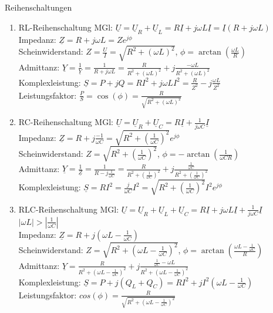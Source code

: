 \documentclass[german]{article}
\begin{document}
Reihenschaltungen
\begin{enumerate}
	\item RL-Reihenschaltung
		MGl: $\underline{U} = \underline{U}_R + \underline{U}_L = R \underline{I} + j\omega L \underline{I} = \underline{I} (R + j\omega L)$ \\
		Impedanz: $\underline{Z} = R + j \omega L = Z e^{j\phi}$ \\
		Scheinwiderstand: $Z = \frac{U}{I} = \sqrt{R^2 + (\omega L)^2}$, $\phi = \arctan\left( \frac{\omega L}{R} \right)$ \\
		Admittanz: $\underline{Y} = \frac1{\underline{Y}} = \frac1{R + j\omega L} = \frac{R}{R^2 + (\omega L)^2} + j \frac{-\omega L}{R^2 + (\omega L)^2}$ \\
		Komplexleistung: $\underline{S} = P + j Q = RI^2 + j\omega L I^2 = \frac{R}{Z^2} - j\frac{\omega L}{Z^2}$ \\
		Leistungsfaktor: $\frac{P}{S} = \cos(\phi) = \frac{R}{\sqrt{R^2 + (\omega L)^2}}$
	\item RC-Reihenschaltung
		MGl: $\underline{U} = \underline{U}_R + \underline{U}_C = R\underline{I} + \frac1{j\omega C} \underline{I}$ \\
		Impedanz: $\underline{Z} = R + j \frac{-1}{\omega C} = \sqrt{R^2 + \left( \frac1{\omega C} \right)^2} e^{j\phi}$ \\
		Scheinwiderstand: $Z = \sqrt{R^2 + \left( \frac1{\omega C} \right)^2}$, $\phi = - \arctan\left( \frac1{\omega CR} \right)$ \\
		Admittanz: $\underline{Y} = \frac1{\underline{Z}} = \frac1{R - j \frac1{\omega C}} = \frac{R}{R^2 + \left( \frac1{\omega C} \right)^2} + j \frac{\frac1{\omega C}}{R^2 + \left( \frac1{\omega C} \right)^2}$ \\
		Komplexleistung: $\underline{S} = R I^2 = \frac{j}{\omega C} I^2 = \sqrt{R^2 + \left( \frac1{\omega C} \right)^2} I^2 e^{j\phi}$
	\item RLC-Reihenschaltung
		MGl: $\underline{U} = \underline{U}_R + \underline{U}_L + \underline{U}_C = R \underline{I} + j \omega L \underline{I} + \frac1{j \omega C} \underline{I}$ \\
		$| \omega L | > | \frac1{\omega C} |$ \\
		Impedanz: $\underline{Z} = R + j(\omega L - \frac1{\omega C})$ \\
		Scheinwiderstand: $Z = \sqrt{R^2 + \left( \omega L - \frac1{\omega C} \right)^2}$, $\phi = \arctan\left( \frac{\omega L - \frac1{\omega C}}R \right)$ \\
		Admittanz: $\underline{Y} = \frac{R}{R^2 + \left( \omega L - \frac1{\omega C} \right)^2} + j \frac{\frac1{\omega C} - \omega L}{R^2 + \left( \omega L - \frac1{\omega C} \right)^2}$ \\
		Komplexleistung: $\underline{S} = P + j(Q_L + Q_C) = RI^2 + jI^2 \left( \omega L - \frac1{\omega C} \right)$ \\
		Leistungsfaktor: $cos(\phi) = \frac{R}{\sqrt{R^2 + \left( \omega L - \frac1{\omega C} \right)^2}}$
\end{enumerate}
\end{document}
